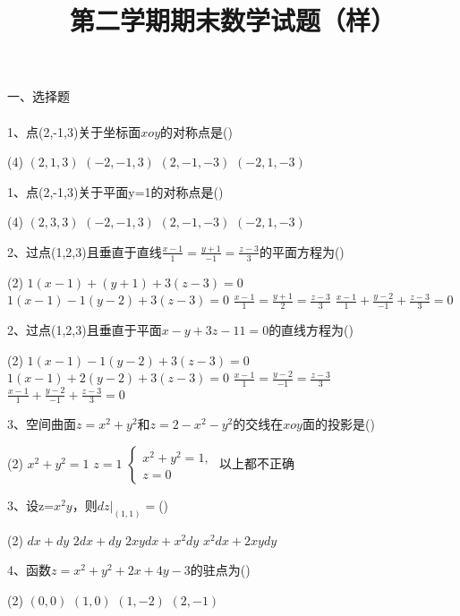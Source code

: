 \documentclass[12pt,a3paper]{article}
\title{第二学期期末数学试题（样）}
\date{}
\begin{document}
\maketitle


一、选择题
\\\\
1、点(2,-1,3)关于坐标面$xoy$的对称点是\hfill(\qquad)
\begin{tasks}(4)
    \task $(2,1,3)$
    \task $(-2,-1,3)$
    \task $(2,-1,-3)$
    \task $(-2,1,-3)$
    \\
\end{tasks}
1、点(2,-1,3)关于平面y=1的对称点是\hfill(\qquad)
\begin{tasks}(4)
    \task $(2,3,3)$
    \task $(-2,-1,3)$
    \task $(2,-1,-3)$
    \task $(-2,1,-3)$
    \\
\end{tasks}
2、过点(1,2,3)且垂直于直线$\frac{x-1}{1}=\frac{y+1}{-1}=\frac{z-3}{3}$的平面方程为\hfill(\qquad)
\begin{tasks}(2)
    \task $1(x-1)+(y+1)+3(z-3)=0$
    \task $1(x-1)-1(y-2)+3(z-3)=0$
    \task $\frac{x-1}{1}=\frac{y+1}{2}=\frac{z-3}{3}$
    \task $\frac{x-1}{1}+\frac{y-2}{-1}+\frac{z-3}{3}=0$
    \\
\end{tasks}
2、过点(1,2,3)且垂直于平面$x-y+3z-11=0$的直线方程为\hfill(\qquad)
\begin{tasks}(2)
    \task $1(x-1)-1(y-2)+3(z-3)=0$
    \task $1(x-1)+2(y-2)+3(z-3)=0$
    \task $\frac{x-1}{1}=\frac{y-2}{-1}=\frac{z-3}{3}$
    \\
    \task $\frac{x-1}{1}+\frac{y-2}{-1}+\frac{z-3}{3}=0$
\end{tasks}
3、空间曲面$z=x^2+y^2$和$z=2-x^2-y^2$的交线在$xoy$面的投影是\hfill(\qquad)
\begin{tasks}(2)
    \task $x^2+y^2=1$
    \task $z=1$
    \task $
    \begin{cases}
        x^2+y^2=1,\\
        z=0
    \end{cases}$
    \task 以上都不正确
    \\
\end{tasks}
3、设z=$x^2y$，则$dz|_{(1,1)}=$\hfill(\qquad)
\begin{tasks}(2)
    \task $dx+dy$
    \task $2dx+dy$
    \task $2xydx+x^2dy$
    \task $x^2dx+2xydy$
    \\
\end{tasks}
4、函数$z=x^2+y^2+2x+4y-3$的驻点为\hfill(\qquad)
\begin{tasks}(2)
    \task $(0,0)$
    \task $(1,0)$
    \task $(1,-2)$
    \task $(2,-1)$
    \\
\end{tasks}
\end{document}
